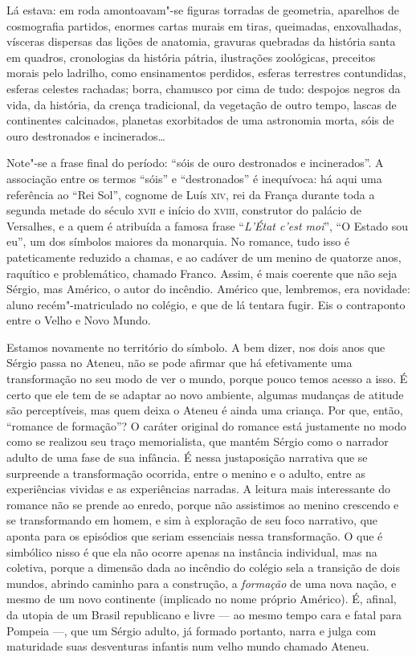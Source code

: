 \begin{hedraquote}
Lá estava: em roda amontoavam"-se figuras torradas de geometria,
aparelhos de cosmografia partidos, enormes cartas murais em tiras,
queimadas, enxovalhadas, vísceras dispersas das lições de anatomia,
gravuras quebradas da história santa em quadros, cronologias da
história pátria, ilustrações zoológicas, preceitos morais pelo
ladrilho, como ensinamentos perdidos, esferas terrestres contundidas,
esferas celestes rachadas; borra, chamusco por cima de tudo: despojos
negros da vida, da história, da crença tradicional, da vegetação de
outro tempo, lascas de continentes calcinados, planetas exorbitados de
uma astronomia morta, sóis de ouro destronados e incinerados\ldots{}
\end{hedraquote}


Note"-se a frase final do período: ``sóis de ouro destronados e
incinerados''. A associação entre os termos ``sóis'' e ``destronados'' é
inequívoca: há aqui uma referência ao ``Rei Sol'', cognome de Luís \textsc{xiv},
rei da França durante toda a segunda metade do século \textsc{xvii} e início do
\textsc{xviii}, construtor do palácio de Versalhes, e a quem é atribuída a
famosa frase ``\textit{L'État c'est moi}'', ``O Estado sou eu'', um dos símbolos
maiores da monarquia. No romance, tudo isso é pateticamente reduzido a chamas,
e ao cadáver de um menino de quatorze anos, raquítico e problemático,
chamado Franco. Assim, é mais coerente que não seja Sérgio, mas
Américo, o autor do incêndio. Américo que, lembremos, era novidade: \enlargethispage{1cm}
aluno recém"-matriculado no colégio, e que de lá tentara fugir. Eis o
contraponto entre o Velho e Novo Mundo.

Estamos novamente no território do símbolo. A bem dizer,
nos dois anos que Sérgio passa no Ateneu, não se pode afirmar que há
efetivamente uma transformação no seu modo de ver o mundo, porque pouco
temos acesso a isso. É certo que ele tem de se adaptar ao novo
ambiente, algumas mudanças de atitude são perceptíveis, mas quem deixa
o Ateneu é ainda uma criança. Por que, então, ``romance de formação''? O
caráter original do romance está justamente no modo como se realizou
seu traço memorialista, que mantém Sérgio como o narrador adulto de uma
fase de sua infância. É nessa justaposição narrativa que se surpreende
a transformação ocorrida, entre o menino e o adulto, entre as
experiências vividas e as experiências narradas. A leitura mais
interessante do romance não se prende ao enredo, porque não assistimos
ao menino crescendo e se transformando em homem, e sim à exploração de
seu foco narrativo, que aponta para os episódios que seriam essenciais
nessa transformação. O que é simbólico nisso é que ela não ocorre
apenas na instância individual, mas na coletiva, porque a dimensão dada
ao incêndio do colégio sela a transição de dois mundos, abrindo caminho
para a construção, a \textit{formação} de
uma nova nação, e mesmo de um novo continente (implicado no nome
próprio Américo). É, afinal, da utopia de um Brasil republicano e livre --- ao
mesmo tempo cara e fatal para Pompeia ---, que um Sérgio adulto, já 
formado portanto, narra e julga com maturidade suas desventuras
infantis num velho mundo chamado Ateneu. 
